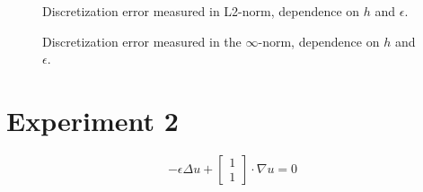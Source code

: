 \documentclass[a4paper,10pt]{article}
\begin{document}
\begin{figure}[!ht]
\centering
{}
\caption{Discretization error measured in L2-norm, dependence on $h$ and $\epsilon$.}
\end{figure}

\begin{figure}[!ht]
\centering
{}
\caption{Discretization error measured in the $\infty$-norm, dependence on $h$ and $\epsilon$.}
\end{figure}

\section{Experiment 2}

\[-\epsilon\Delta u + \begin{bmatrix}1\\1\end{bmatrix}\cdot \nabla u = 0\]
\end{document}
